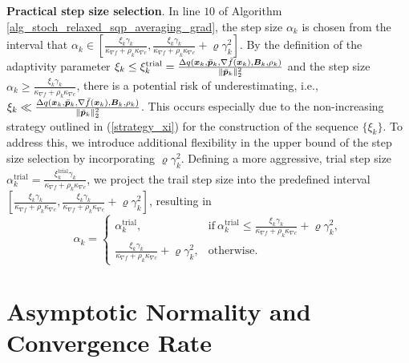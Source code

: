 \documentclass[aos]{imsart}
\numberwithin{equation}{section}
\theoremstyle{plain}
\begin{document}
\textbf{Practical step size selection}. In line $10$ of  Algorithm \ref{alg_stoch_relaxed_sqp_averaging_grad},
the step size $\alpha_k$ is chosen from the interval that $\alpha_k \in  \left[ \frac{ \xi_{k}\gamma_k}{\kappa_{\nabla f} + \rho_k \kappa_{\nabla c}} , \frac{ \xi_{k}\gamma_k}{\kappa_{\nabla f} + \rho_k \kappa_{\nabla c}} + \varrho \gamma_k^2 \right]$. 
By the definition of the adaptivity parameter $\xi_k \leq \xi_{k}^{\text{trial}} =  \frac{\Delta q(\bm{x}_k,\Bar{\bm{p}}_k, \nabla \Bar{f}(\bm{x}_k),\bm{B}_k,\rho_k)}{\|\Bar{\bm{p}}_k\|_2^2}$ and the step size $\alpha_k \geq \frac{ \xi_{k}\gamma_k}{\kappa_{\nabla f} + \rho_k \kappa_{\nabla c}} $, there is a potential risk of underestimating, i.e., $\xi_k \ll  \frac{\Delta q(\bm{x}_k,\Bar{\bm{p}}_k, \nabla \Bar{f}(\bm{x}_k),\bm{B}_k,\rho_k)}{\|\Bar{\bm{p}}_k\|_2^2}$. This occurs especially due to the non-increasing strategy outlined in (\ref{strategy_xi}) for the construction of the sequence $\{\xi_k\}$. To address this, we introduce additional flexibility in the upper bound of the step size selection by incorporating $\varrho \gamma_k^2$. Defining a more aggressive, trial step size $\alpha_k^{\text{trial}} =  \frac{ \xi_{k}^{\text{trial}}\gamma_k}{\kappa_{\nabla f} + \rho_k \kappa_{\nabla c}} $, we project the trail step size into the predefined interval $\left[ \frac{ \xi_{k}\gamma_k}{\kappa_{\nabla f} + \rho_k \kappa_{\nabla c}}, \frac{ \xi_{k}\gamma_k}{\kappa_{\nabla f} + \rho_k \kappa_{\nabla c}} + \varrho \gamma_k^2 \right]$, resulting in 
\begin{equation}
    \alpha_k = \left\{ \begin{array}{cc}
       \alpha_k^{\text{trial}},  & \text{if}~\alpha_k^{\text{trial}} \leq \frac{ \xi_{k}\gamma_k}{\kappa_{\nabla f} + \rho_k \kappa_{\nabla c}} + \varrho \gamma_k^2, \\
       \frac{ \xi_{k}\gamma_k}{\kappa_{\nabla f} + \rho_k \kappa_{\nabla c}} + \varrho \gamma_k^2,  & \text{otherwise}. 
    \end{array} \right.
\end{equation}


\section{Asymptotic Normality and Convergence Rate}
\label{sec:asymptotic}
\end{document}
